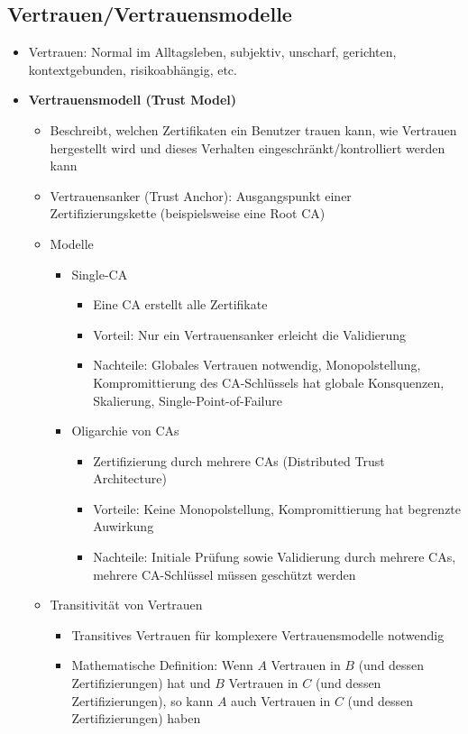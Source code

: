 \subsection{Vertrauen/Vertrauensmodelle}
\begin{itemize}
	\item Vertrauen: Normal im Alltagsleben, subjektiv, unscharf, gerichten, kontextgebunden, risikoabhängig, etc.
	\item \textbf{Vertrauensmodell (Trust Model)}
	\begin{itemize}
		\item Beschreibt, welchen Zertifikaten ein Benutzer trauen kann, wie Vertrauen hergestellt wird und dieses Verhalten eingeschränkt/kontrolliert werden kann
		\item Vertrauensanker (Trust Anchor): Ausgangspunkt einer Zertifizierungskette (beispielsweise eine Root CA)
		\item Modelle
		\begin{itemize}
			\item Single-CA
			\begin{itemize}
				\item Eine CA erstellt alle Zertifikate
				\item Vorteil: Nur ein Vertrauensanker erleicht die Validierung
				\item Nachteile: Globales Vertrauen notwendig, Monopolstellung, Kompromittierung des CA-Schlüssels hat globale Konsquenzen, Skalierung, Single-Point-of-Failure
			\end{itemize}
			\item Oligarchie von CAs
			\begin{itemize}
				\item Zertifizierung durch mehrere CAs (Distributed Trust Architecture)
				\item Vorteile: Keine Monopolstellung, Kompromittierung hat begrenzte Auwirkung
				\item Nachteile: Initiale Prüfung sowie Validierung durch mehrere CAs, mehrere CA-Schlüssel müssen geschützt werden
			\end{itemize}
		\end{itemize}
		\item Transitivität von Vertrauen
		\begin{itemize}
			\item Transitives Vertrauen für komplexere Vertrauensmodelle notwendig
			\item Mathematische Definition: Wenn \(A\) Vertrauen in \(B\) (und dessen Zertifizierungen) hat und \(B\) Vertrauen in \(C\) (und dessen Zertifizierungen), so kann \(A\) auch Vertrauen in \(C\) (und dessen Zertifizierungen) haben

\end{itemize}
\end{itemize}
\end{itemize}
